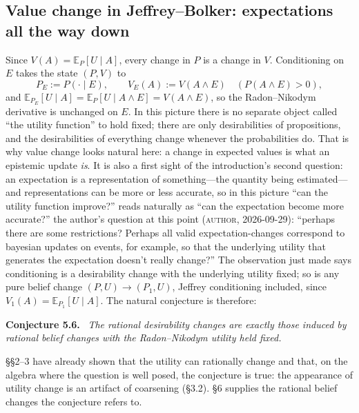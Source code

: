 \documentclass[11pt,a4paper]{article}
\newcommand{\E}{\mathbb{E}}
\newcommand{\AUTHOR}{\textnormal{\scshape author}}
\newenvironment{stmt}[2]{\par\medskip\noindent\textbf{#1 #2.}\ \itshape\ignorespaces}{\par\medskip}
\begin{document}
\subsection{Value change in Jeffrey--Bolker: expectations all the way down}
Since $V(A) = \E_P[U \mid A]$, every change in $P$ is a change in $V$. Conditioning on $E$ takes the state $(P, V)$ to
\[
P_E := P(\cdot \mid E), \qquad V_E(A) := V(A \wedge E) \quad (P(A \wedge E) > 0),
\]
and $\E_{P_E}[U \mid A] = \E_P[U \mid A \wedge E] = V(A \wedge E)$, so the Radon--Nikodym derivative is unchanged on $E$. In this picture there is no separate object called ``the utility function'' to hold fixed; there are only desirabilities of propositions, and the desirabilities of everything change whenever the probabilities do. That is why value change looks natural here: a change in expected values is what an epistemic update \emph{is}. It is also a first sight of the introduction's second question: an expectation is a representation of something---the quantity being estimated---and representations can be more or less accurate, so in this picture ``can the utility function improve?'' reads naturally as ``can the expectation become more accurate?'' the author's question at this point (\AUTHOR, 2026-09-29): ``perhaps there are some restrictions? Perhaps all valid expectation-changes correspond to bayesian updates on events, for example, so that the underlying utility that generates the expectation doesn't really change?'' The observation just made says conditioning is a desirability change with the underlying utility fixed; so is any pure belief change $(P, U) \to (P_1, U)$, Jeffrey conditioning included, since $V_1(A) = \E_{P_1}[U \mid A]$. The natural conjecture is therefore:

\begin{stmt}{Conjecture}{5.6}
The rational desirability changes are exactly those induced by rational belief changes with the Radon--Nikodym utility held fixed.
\end{stmt}

\S\S2--3 have already shown that the utility can rationally change and that, on the algebra where the question is well posed, the conjecture is true: the appearance of utility change is an artifact of coarsening (\S3.2). \S6 supplies the rational belief changes the conjecture refers to.

\end{document}
